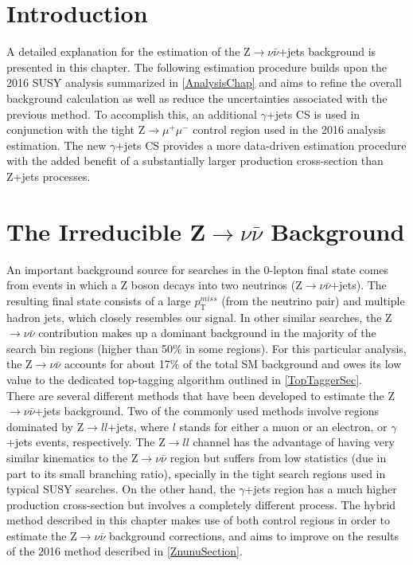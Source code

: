 \section{Introduction}

A detailed explanation for the estimation of the Z$\rightarrow\nu\bar{\nu}$+jets background is presented in this chapter. The following estimation procedure builds upon the 2016 SUSY analysis summarized in \autoref{AnalysisChap} and aims to refine the overall background calculation as well as reduce the uncertainties associated with the previous method. To accomplish this, an additional $\gamma$+jets CS is used in conjunction with the tight Z$\rightarrow\mu^{+}\mu^{-}$ control region used in the 2016 analysis estimation. The new $\gamma$+jets CS provides a more data-driven estimation procedure with the added benefit of a substantially larger production cross-section than Z+jets processes\cite{Zgamma}.  

\section{The Irreducible Z$\rightarrow\nu\bar{\nu}$ Background}

An important background source for searches in the 0-lepton final state comes from events in which a Z boson decays into two neutrinos (Z$\rightarrow\nu\bar{\nu}$+jets). The resulting final state consists of a large $p_\text{T}^{miss}$ (from the neutrino pair) and multiple hadron jets, which closely resembles our signal. In other similar searches, the Z$\rightarrow\nu\bar{\nu}$ contribution makes up a dominant background in the majority of the search bin regions (higher than 50\% in some regions)\cite{OtherAna1,OtherAna2}. For this particular analysis, the Z$\rightarrow\nu\bar{\nu}$ accounts for about 17\% of the total SM background and owes its low value to the dedicated top-tagging algorithm outlined in \autoref{TopTaggerSec}.\\

There are several different methods that have been developed to estimate the Z$\rightarrow\nu\bar{\nu}$+jets background\cite{ZInv}. Two of the commonly used methods involve regions dominated by Z$\rightarrow ll$+jets, where $l$ stands for either a muon or an electron, or $\gamma$+jets events, respectively. The Z$\rightarrow ll$ channel has the advantage of having very similar kinematics to the Z$\rightarrow\nu\bar{\nu}$ region but suffers from low statistics (due in part to its small branching ratio), specially in the tight search regions used in typical SUSY searches. On the other hand, the $\gamma$+jets region has a much higher production cross-section but involves a completely different process. The hybrid method described in this chapter makes use of both control regions in order to estimate the Z$\rightarrow\nu\bar{\nu}$ background corrections, and aims to improve on the results of the 2016 method described in \autoref{ZnunuSection}.

